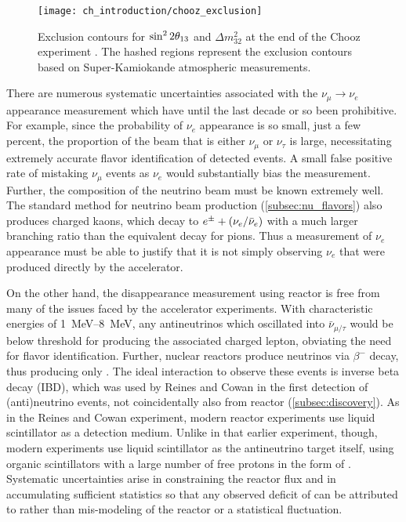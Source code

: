 \begin{figure}
    \centering
    \texttt{[image: ch\_introduction/chooz\_exclusion]}
    \caption{
        Exclusion contours for $\sin^22\theta_{13}$ and $\Delta m^2_{32}$
        at the end of the Chooz experiment \cite{chooz1999}.
        The hashed regions represent the exclusion contours
        based on Super-Kamiokande atmospheric measurements.
    }
    \label{fig:chooz_exclusion}
\end{figure}


There are numerous systematic uncertainties associated with the $\nu_\mu\to\nu_e$ appearance measurement
which have until the last decade or so been prohibitive.
For example, since the probability of $\nu_e$ appearance is so small,
just a few percent,
the proportion of the beam that is either $\nu_\mu$ or $\nu_\tau$ is large,
necessitating extremely accurate flavor identification of detected events.
A small false positive rate of mistaking $\nu_\mu$ events as $\nu_e$
would substantially bias the measurement.
Further, the composition of the neutrino beam must be known extremely well.
The standard method for neutrino beam production (\cref{subsec:nu_flavors})
also produces charged kaons, which decay to $e^\pm + (\nu_e/\bar{\nu}_e)$
with a much larger branching ratio than the equivalent decay for pions.
Thus a measurement of $\nu_e$ appearance must be able to justify
that it is not simply observing $\nu_e$ that were produced directly
by the accelerator.

On the other hand, the disappearance measurement using reactor \nuebar{} is
free from many of the issues faced by the accelerator experiments.
With characteristic energies of \SIrange{1}{8}{\MeV},
any antineutrinos which oscillated into $\bar{\nu}_{\mu/\tau}$
would be below threshold for producing the associated charged lepton,
obviating the need for flavor identification.
Further, nuclear reactors produce neutrinos via $\beta^-$ decay,
thus producing only \nuebar{}.
The ideal interaction to observe these \nuebar{} events
is inverse beta decay (IBD),
which was used by Reines and Cowan in the first detection of (anti)neutrino events,
not coincidentally also from reactor \nuebar{} (\cref{subsec:discovery}).
As in the Reines and Cowan experiment,
modern reactor \nuebar{} experiments use liquid scintillator
as a detection medium.
Unlike in that earlier experiment, though,
modern experiments use liquid scintillator as the antineutrino target itself,
using organic scintillators with a large number of free protons
in the form of .
Systematic uncertainties arise in constraining the reactor \nuebar{} flux
and in accumulating sufficient statistics
so that any observed deficit of \nuebar{}
can be attributed to \thetaot{} rather than mis-modeling of the reactor
or a statistical fluctuation.

